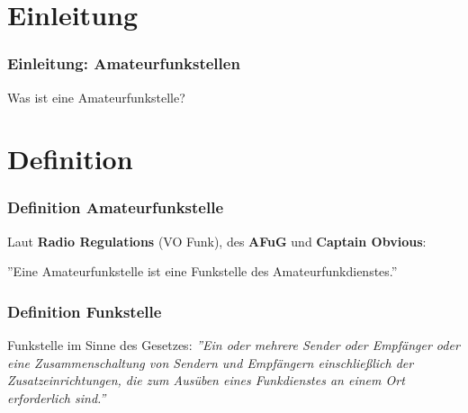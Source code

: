 

\subtitle{Betriebstechnik/Vorschriften 08: \\
          Amateurfunkstellen \\[2em]}
\date{Stand 04.12.2014}



\section{Einleitung}

\begin{frame}
    \frametitle{Einleitung: Amateurfunkstellen}

    \begin{center}
        \Large{Was ist eine Amateurfunkstelle?}
    \end{center}

\end{frame}

\section{Definition}

\begin{frame}
    \frametitle{Definition Amateurfunkstelle}

    Laut \textbf{Radio Regulations} (VO Funk), des \textbf{AFuG} und \textbf{Captain
    Obvious}: \\[2em]
    
    \begin{center}
        ''Eine Amateurfunkstelle ist eine Funkstelle des Amateurfunkdienstes.''
    \end{center}

\end{frame}

\begin{frame}
    \frametitle{Definition Funkstelle}

    Funkstelle im Sinne des Gesetzes: \emph{''Ein oder mehrere Sender oder
    Empfänger oder eine Zusammenschaltung von Sendern und Empfängern
    einschließlich der Zusatzeinrichtungen, die zum Ausüben eines Funkdienstes
    an einem Ort erforderlich sind.''} \\[3em]


\end{frame}

